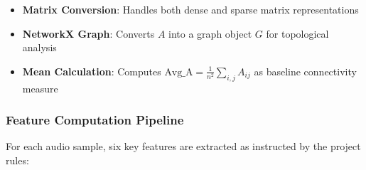 \documentclass[12pt]{ieeetj}
\begin{document}
\begin{itemize}
    \item \textbf{Matrix Conversion}: Handles both dense and sparse matrix representations
    \item \textbf{NetworkX Graph}: Converts $A$ into a graph object $G$ for topological analysis
    \item \textbf{Mean Calculation}: Computes $\text{Avg\_A} = \frac{1}{n^2}\sum_{i,j}A_{ij}$ as baseline connectivity measure
\end{itemize}

\subsubsection{Feature Computation Pipeline}
For each audio sample, six key features are extracted as instructed by the project rules:
\end{document}
